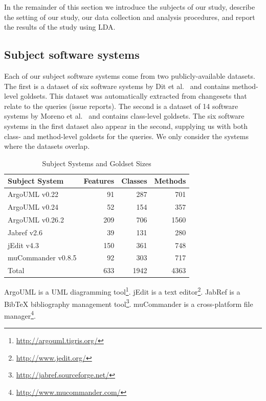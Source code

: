 In the remainder of this section we introduce the subjects of our study,
describe the setting of our study, our data collection and analysis procedures,
and report the results of the study using LDA.


\subsection{Subject software systems}

Each of our subject software systems come from two publicly-available datasets.
The first is a dataset of six software systems by Dit et
al.~\cite{Dit-etal_2013} and contains method-level goldsets.  This dataset was
automatically extracted from changesets that relate to the queries (issue
reports). The second is a dataset of 14 software systems by Moreno et
al.~\cite{Moreno-etal_2014} and contains class-level goldsets.  The six software
systems in the first dataset also appear in the second, supplying us with both
class- and method-level goldsets for the queries.  We only consider the systems
where the datasets overlap.

\begin{table}[t]
\renewcommand{\arraystretch}{1.3}
\footnotesize
\centering
\caption{Subject Systems and Goldset Sizes}
\begin{tabular}{lrrr}
    \toprule
    Subject System     & Features & Classes & Methods \\
    \midrule
    ArgoUML v0.22      & 91       & 287     & 701     \\
    ArgoUML v0.24      & 52       & 154     & 357     \\
    ArgoUML v0.26.2    & 209      & 706     & 1560    \\
    Jabref v2.6        & 39       & 131     & 280     \\
    jEdit v4.3         & 150      & 361     & 748     \\
    muCommander v0.8.5 & 92       & 303     & 717     \\
    \midrule
    Total              & 633      & 1942    & 4363    \\
    \bottomrule
\end{tabular}
\label{table:subjects}
\end{table}


ArgoUML is a UML diagramming tool\footnote{\url{http://argouml.tigris.org/}}.
jEdit is a text editor\footnote{\url{http://www.jedit.org/}}.
JabRef is a BibTeX bibliography management tool\footnote{\url{http://jabref.sourceforge.net/}}.
muCommander is a cross-platform file manager\footnote{\url{http://www.mucommander.com/}}.


